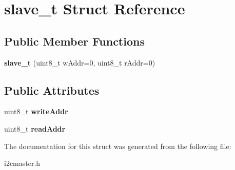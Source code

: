 \hypertarget{structslave__t}{}\section{slave\+\_\+t Struct Reference}
\label{structslave__t}
\subsection*{Public Member Functions}
\begin{DoxyCompactItemize}
\item 
\mbox{\label{structslave__t_a50d44b07fa05774c4c213fc5d1507227}} 
{\bfseries slave\+\_\+t} (uint8\+\_\+t w\+Addr=0, uint8\+\_\+t r\+Addr=0)
\end{DoxyCompactItemize}
\subsection*{Public Attributes}
\begin{DoxyCompactItemize}
\item 
\mbox{\label{structslave__t_a196e25cee6c8b9b6d8f66cfcba13feff}} 
uint8\+\_\+t {\bfseries write\+Addr}
\item 
\mbox{\label{structslave__t_a014945119b5636f2aa55604e1b63c3d2}} 
uint8\+\_\+t {\bfseries read\+Addr}
\end{DoxyCompactItemize}


The documentation for this struct was generated from the following file\+:\begin{DoxyCompactItemize}
\item 
i2cmaster.\+h\end{DoxyCompactItemize}
